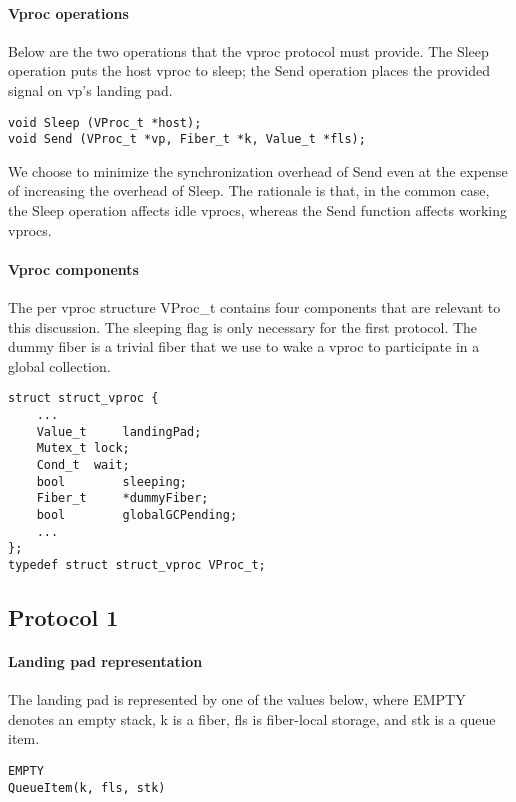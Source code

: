 \documentclass[11pt]{article}
\begin{document}
\paragraph{Vproc operations}
Below are the two operations that the vproc protocol must provide.
The Sleep operation puts the host vproc to sleep;
the Send operation places the provided signal on vp's landing pad.
\lstset{language=C}
\lstset{commentstyle=\textit}
\begin{lstlisting}
void Sleep (VProc_t *host);
void Send (VProc_t *vp, Fiber_t *k, Value_t *fls);
\end{lstlisting}
We choose to minimize the synchronization overhead of Send even at the expense of
increasing the overhead of Sleep.
The rationale is that, in the common case, the Sleep operation affects idle vprocs, whereas
the Send function affects working vprocs.

\paragraph{Vproc components}
The per vproc structure VProc\_t contains four components that are relevant to this discussion.
The sleeping flag is only necessary for the first protocol.
The dummy fiber is a trivial fiber that we use to wake a vproc to participate
in a global collection.
\lstset{language=C}
\lstset{commentstyle=\textit}
\begin{lstlisting}
struct struct_vproc {
    ...
    Value_t     landingPad;
    Mutex_t	lock;
    Cond_t	wait;
    bool        sleeping;
    Fiber_t     *dummyFiber;
    bool        globalGCPending;
    ...
};
typedef struct struct_vproc VProc_t;
\end{lstlisting}

\subsection{Protocol 1}\label{sec:protocol1}

\paragraph{Landing pad representation}
The landing pad is represented by one of the values below, where EMPTY
denotes an empty stack, k is a fiber, fls is fiber-local storage, and stk
is a queue item.
\lstset{language=C}
\lstset{commentstyle=\textit}
\begin{lstlisting}
EMPTY
QueueItem(k, fls, stk)
\end{lstlisting}
\end{document}
